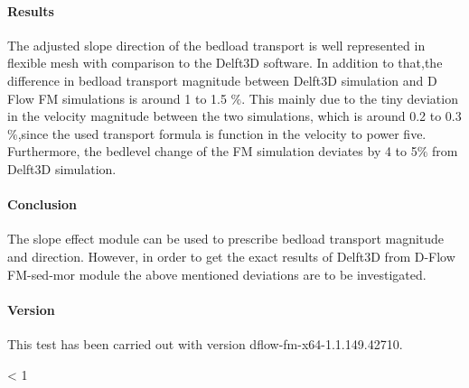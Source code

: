 \paragraph*{Results}
The adjusted slope direction of the bedload transport is well represented in flexible mesh with comparison to the Delft3D software.
In addition to that,the difference in bedload transport magnitude between Delft3D simulation and D Flow FM simulations is around 1 to 1.5 $\%$.
This mainly due to the tiny deviation in the velocity magnitude between the two simulations, which is around 0.2 to 0.3 $\%$,since the used transport
 formula is function in the velocity to  power five. Furthermore, the bedlevel change of the FM simulation deviates by 4 to 5$\%$ from Delft3D simulation. 
\paragraph*{Conclusion}
The slope effect module can be used to prescribe bedload transport magnitude and direction. However, in order to get the exact results of Delft3D from D-Flow FM-sed-mor module the above mentioned deviations are to be investigated.
\paragraph*{Version}
This test has been carried out with version dflow-fm-x64-1.1.149.42710.

 < 1
\fi
\endinput
